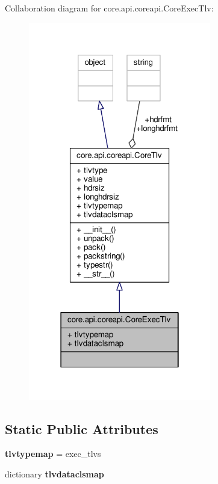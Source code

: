 Collaboration diagram for core.\+api.\+coreapi.\+Core\+Exec\+Tlv\+:
\nopagebreak
\begin{figure}[H]
\begin{center}
\leavevmode
\includegraphics[width=226pt]{classcore_1_1api_1_1coreapi_1_1_core_exec_tlv__coll__graph}
\end{center}
\end{figure}
\subsection*{Static Public Attributes}
\begin{DoxyCompactItemize}
\item 
\hypertarget{classcore_1_1api_1_1coreapi_1_1_core_exec_tlv_aa507e8cbe3860027b2b1bc6bb023010f}{{\bfseries tlvtypemap} = exec\+\_\+tlvs}\label{classcore_1_1api_1_1coreapi_1_1_core_exec_tlv_aa507e8cbe3860027b2b1bc6bb023010f}

\item 
dictionary {\bfseries tlvdataclsmap}
\end{DoxyCompactItemize}
